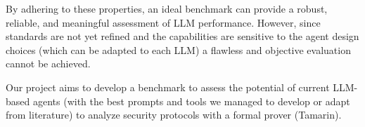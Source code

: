 By adhering to these properties, an ideal benchmark can provide a robust, reliable, and meaningful assessment of LLM performance. However, since standards are not yet refined and the capabilities are sensitive to the agent design choices (which can be adapted to each LLM) a flawless and objective evaluation cannot be achieved.

Our project aims to develop a benchmark to assess the potential of current LLM-based agents (with the best prompts and tools we managed to develop or adapt from literature) to analyze security protocols with a formal prover (Tamarin). 